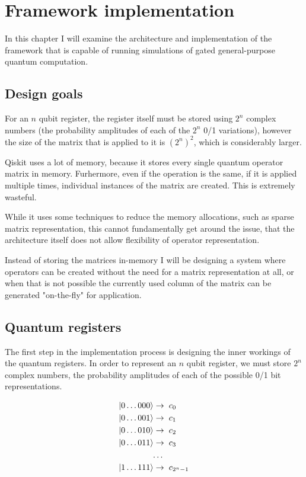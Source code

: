 \chapter{Framework implementation}

In this chapter I will examine the architecture and implementation of the framework that is capable of running simulations of gated general-purpose quantum computation.

\section{Design goals}

For an $n$ qubit register, the register itself must be stored using $2^n$ complex numbers (the probability amplitudes of each of the $2^n$ 0/1 variations), however the size of the matrix that is applied to it is $(2^n)^2$, which is considerably larger.

Qiskit uses a lot of memory, because it stores every single quantum operator matrix in memory. Furhermore, even if the operation is the same, if it is applied multiple times, individual instances of the matrix are created. This is extremely wasteful.

While it uses some techniques to reduce the memory allocations, such as sparse matrix representation, this cannot fundamentally get around the issue, that the architecture itself does not allow flexibility of operator representation.

Instead of storing the matrices in-memory I will be designing a system where operators can be created without the need for a matrix representation at all, or when that is not possible the currently used column of the matrix can be generated "on-the-fly" for application.

\section{Quantum registers}

The first step in the implementation process is designing the inner workings of the quantum registers. In order to represent an $n$ qubit register, we must store $2^n$ complex numbers, the probability amplitudes of each of the possible 0/1 bit representations.

\begin{align*}
\ket{0\dots{}000} \rightarrow & \hspace{2mm} c_0 \\
\ket{0\dots{}001} \rightarrow & \hspace{2mm}  c_1 \\
\ket{0\dots{}010} \rightarrow & \hspace{2mm} c_2 \\
\ket{0\dots{}011} \rightarrow & \hspace{2mm} c_3 \\
\dots{} \\
\ket{1\dots{}111} \rightarrow & \hspace{2mm} c_{2^n-1}
\end{align*}

